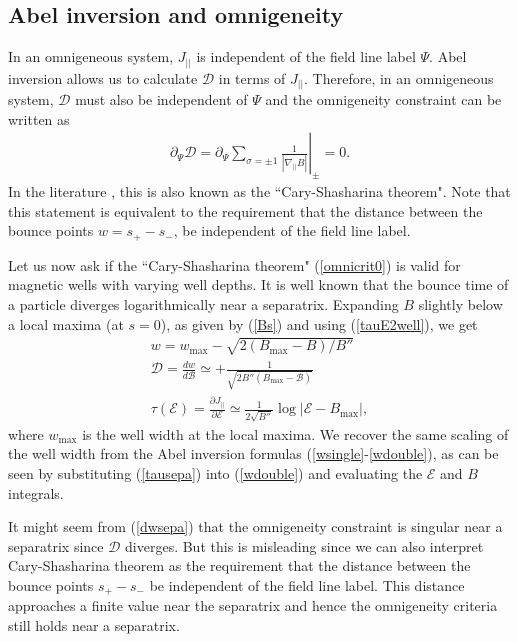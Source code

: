 \documentclass[aip,pop,reprint]{revtex4-1}
\newcommand*\at[2]{\left.#1\right|_{#2}}
\newcommand*{\cB}{\mathcal{B}}
\newcommand*{\cD}{\mathcal{D}}
\newcommand*{\cE}{\mathcal{E}}
\newcommand*{\dpl}{\nabla_{||}}
\newcommand*{\Jpl}{J_{||}}
\newcommand*{\del}{\partial}
\newcommand*\smpi[2]{s_{#1}^{#2}}
\newcommand*{\Bmax}{B_{\text{max}}}
\newcommand*{\wmax}{w_{\text{max}}}
\begin{document}
\subsection{Abel inversion and omnigeneity}
\label{sec:sepa}
In an omnigeneous system, $\Jpl$ is independent of the field line label $\Psi$. Abel inversion allows us to calculate $\cD$ in terms of $\Jpl$. Therefore, in an omnigeneous system, $\cD$ must also be independent of $\Psi$ and the omnigeneity constraint can be written as
\begin{align}
\del_\Psi \cD = \del_\Psi \sum_{\sigma=\pm 1} \at{\frac{1}{|\dpl B|}}{\pm}=0.
\label{omnicrit0}
\end{align} 
 In the literature \cite{helander2014theory,landremancatto2012omnigenity}, this is also known as the ``Cary-Shasharina theorem". Note that this statement is equivalent to the requirement that the distance between the bounce points $w=\smpi{+}{}-\smpi{-}{}$, be independent of the field line label.

Let us now ask if the ``Cary-Shasharina theorem" (\ref{omnicrit0}) is valid for magnetic wells with varying well depths. It is well known that the bounce time of a particle diverges logarithmically near a separatrix.
 Expanding $B$ slightly below a local maxima (at $s=0$), as given by (\ref{Bs}) and using (\ref{tauE2well}), we get
 \begin{subequations}
 \begin{align}
 w= \wmax-\sqrt{2(\Bmax-B)/B''} \label{wsepa}\\
 \cD=\frac{dw}{d\cB} \simeq +\frac{1}{\sqrt{2B''(\Bmax-\cB)}} \label{dwsepa}\\
 \tau(\cE) =\frac{\partial \Jpl}{\partial \cE}\simeq\frac{1}{2\sqrt{B''}}\log|\cE-\Bmax| , \label{tausepa}
 \end{align}
 \end{subequations}
 where $\wmax$ is the well width at the local maxima. We recover the same scaling of the well width from the Abel inversion formulas (\ref{wsingle}-\ref{wdouble}), as can be seen by substituting (\ref{tausepa}) into (\ref{wdouble}) and evaluating the $\cE$ and $B$ integrals. 
 
It might seem from (\ref{dwsepa}) that the omnigeneity constraint is singular near a separatrix since $\cD$ diverges. But this is misleading since we can also interpret Cary-Shasharina theorem as the requirement that the distance between the bounce points $\smpi{+}{}-\smpi{-}{}$ be independent of the field line label. This distance approaches a finite value near the separatrix and hence the omnigeneity criteria still holds near a separatrix.
\end{document}
